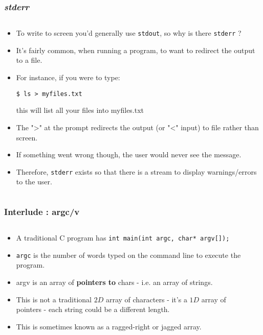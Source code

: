 
\begin{frame}[fragile]
\frametitle{{\em stderr}}
\begin{columns}[T]

\begin{column}{0.90\textwidth}
\begin{itemize}[<+->]
\item To write to screen you'd generally use \verb^stdout^, so why is there \verb^stderr^ ?
\item It's fairly common, when running a program, to want to redirect the output to a file.
\item For instance, if you were to type:
\begin{verbatim}
$ ls > myfiles.txt
\end{verbatim}
this will list all your files into myfiles.txt
\item The ">" at the prompt redirects the output (or "<" input) to file rather than screen.
\item If something went wrong though, the user would never see the message.
\item Therefore, \verb^stderr^ exists so that there is a stream to display warnings/errors to the user.
\end{itemize}
\end{column}

\end{columns}
\end{frame}


\begin{frame}[fragile]
\frametitle{Interlude : argc/v}
\begin{columns}[T]

\begin{column}{0.40\textwidth}
\begin{itemize}[<+->]
\item A traditional C program has \verb^int main(int argc, char* argv[]);^
\item \verb^argc^ is the number of words typed on the command line to execute the program.
\item argv is an array of {\bf pointers to} chars - i.e. an array of strings.
\item This is not a traditional $2D$ array of characters - it's a $1D$ array of pointers - each string could be a different length.
\item This is sometimes known as a ragged-right or jagged array.
\end{itemize}
\end{column}

\begin{column}{0.50\textwidth}

\end{column}

\end{columns}
\end{frame}


